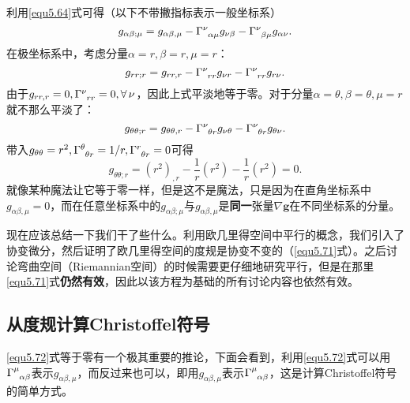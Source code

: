 利用\eqref{equ5.64}式可得（以下不带撇指标表示一般坐标系）
\begin{equation}
    g_{\alpha \beta; \mu} = g_{\alpha \beta, \mu} - \Gamma\indices{^\nu_{\alpha \mu}} g_{\nu \beta} - \Gamma\indices{^\nu_{\beta \mu}} g_{\alpha \nu}.
\label{equ5.72}
\end{equation}
在极坐标系中，考虑分量$\alpha = r, \beta = r, \mu = r$：
\[
    g_{rr; r} = g_{rr, r} - \Gamma\indices{^\nu_{rr}} g_{\nu r} - \Gamma\indices{^\nu_{rr}} g_{r \nu}.
\]
由于$g_{rr, r} = 0, \Gamma\indices{^\nu_{rr}} = 0, \forall\, \nu$，因此上式平淡地等于零。对于分量$\alpha = \theta, \beta = \theta, \mu = r$就不那么平淡了：
\[
    g_{\theta \theta; r} = g_{\theta \theta, r} - \Gamma\indices{^\nu_{\theta r}} g_{\nu \theta} - \Gamma\indices{^\nu_{\theta r}} g_{\theta \nu}.
\]
带入$g_{\theta \theta} = r^2, \Gamma\indices{^\theta_{\theta r}} = 1/r, \Gamma\indices{^r_{\theta r}} = 0$可得
\[
    g_{\theta \theta; r} = (r^2)_{, r} - \frac{1}{r} (r^2) - \frac{1}{r} (r^2) = 0.
\]
就像某种魔法让它等于零一样，但是这不是魔法，只是因为在直角坐标系中$g_{\alpha \beta, \mu} = 0$，而在任意坐标系中的$g_{\alpha \beta; \mu}$与$g_{\alpha \beta, \mu}$是\textbf{同一}张量$\nabla \mathbf{g}$在不同坐标系的分量。

现在应该总结一下我们干了些什么。利用欧几里得空间中平行的概念，我们引入了协变微分，然后证明了欧几里得空间的度规是协变不变的（\eqref{equ5.71}式）。之后讨论弯曲空间（Riemannian空间）的时候需要更仔细地研究平行，但是在那里\eqref{equ5.71}式\textbf{仍然有效}，因此以该方程为基础的所有讨论内容也依然有效。

\subsection*{从度规计算Christoffel符号}
\eqref{equ5.72}式等于零有一个极其重要的推论，下面会看到，利用\eqref{equ5.72}式可以用$\Gamma\indices{^\mu_{\alpha \beta}}$表示$g_{\alpha \beta, \mu}$，而反过来也可以，即用$g_{\alpha \beta, \mu}$表示$\Gamma\indices{^\mu_{\alpha \beta}}$，这是计算Christoffel符号的简单方式。

